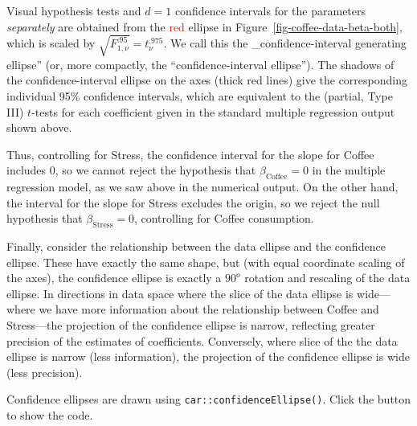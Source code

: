 \documentclass[
  letterpaper,
  10pt,
  krantz2]{krantz}
\begin{document}
Visual hypothesis tests and \(d=1\) confidence intervals for the
parameters \emph{separately} are obtained from the \textcolor{red}{red}
ellipse in Figure~\ref{fig-coffee-data-beta-both}, which is scaled by
\(\sqrt{F^{.95}_{1, \nu}} = t^{.975}_\nu\). We call this the
\_confidence-interval generating ellipse'' (or, more compactly, the
``confidence-interval ellipse''). The shadows of the confidence-interval
ellipse on the axes (thick red lines) give the corresponding individual
95\% confidence intervals, which are equivalent to the (partial, Type
III) \(t\)-tests for each coefficient given in the standard multiple
regression output shown above.

Thus, controlling for Stress, the confidence interval for the slope for
Coffee includes 0, so we cannot reject the hypothesis that
\(\beta_{\mathrm{Coffee}}=0\) in the multiple regression model, as we
saw above in the numerical output. On the other hand, the interval for
the slope for Stress excludes the origin, so we reject the null
hypothesis that \(\beta_{\mathrm{Stress}}=0\), controlling for Coffee
consumption.

Finally, consider the relationship between the data ellipse and the
confidence ellipse. These have exactly the same shape, but (with equal
coordinate scaling of the axes), the confidence ellipse is exactly a
\(90^o\) rotation and rescaling of the data ellipse. In directions in
data space where the slice of the data ellipse is wide---where we have
more information about the relationship between Coffee and Stress---the
projection of the confidence ellipse is narrow, reflecting greater
precision of the estimates of coefficients. Conversely, where slice of
the the data ellipse is narrow (less information), the projection of the
confidence ellipse is wide (less precision).

Confidence ellipses are drawn using \texttt{car::confidenceEllipse()}.
Click the button to show the code.
\end{document}
